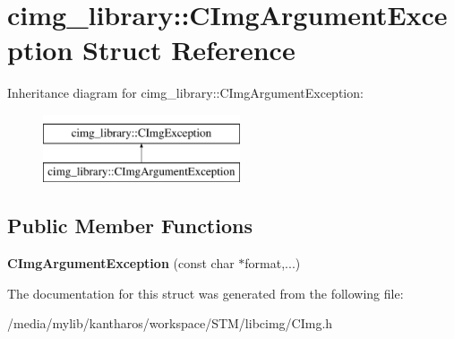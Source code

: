 \hypertarget{structcimg__library_1_1_c_img_argument_exception}{
\section{cimg\_\-library::CImgArgumentException Struct Reference}
\label{structcimg__library_1_1_c_img_argument_exception}
}
Inheritance diagram for cimg\_\-library::CImgArgumentException:\begin{figure}[H]
\begin{center}
\leavevmode
\includegraphics[height=2.000000cm]{structcimg__library_1_1_c_img_argument_exception}
\end{center}
\end{figure}
\subsection*{Public Member Functions}
\begin{DoxyCompactItemize}
\item 
\hypertarget{structcimg__library_1_1_c_img_argument_exception_ae52bd388efe18d588879ccdf117fa8f3}{
{\bfseries CImgArgumentException} (const char $\ast$format,...)}
\label{structcimg__library_1_1_c_img_argument_exception_ae52bd388efe18d588879ccdf117fa8f3}

\end{DoxyCompactItemize}


The documentation for this struct was generated from the following file:\begin{DoxyCompactItemize}
\item 
/media/mylib/kantharos/workspace/STM/libcimg/CImg.h\end{DoxyCompactItemize}
